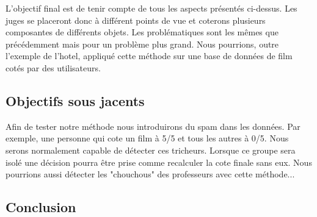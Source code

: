 \documentclass[12pt,a4paper,notitlepage]{article}
\begin{document}
L'objectif final est de tenir compte de tous les aspects présentés ci-dessus. Les juges se placeront donc à différent points de vue et coterons plusieurs composantes de différents objets. Les problématiques sont les mêmes que précédemment mais pour un problème plus grand. Nous pourrions, outre l'exemple de l'hotel, appliqué cette méthode sur une base de données de film cotés par des utilisateurs.

\subsection*{Objectifs sous jacents}

Afin de tester notre méthode nous introduirons du spam dans les données. Par exemple, une personne qui cote un film à 5/5 et tous les autres à 0/5. Nous serons normalement capable de détecter ces tricheurs. Lorsque ce groupe sera isolé une décision pourra être prise comme recalculer la cote finale sans eux. Nous pourrions aussi détecter les "chouchous" des professeurs avec cette méthode...\\

\subsection*{Conclusion}
\end{document}
